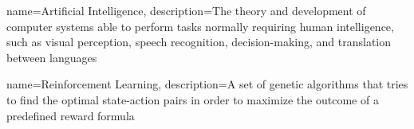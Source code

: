 
{
	name={Artificial Intelligence},
	description={The theory and development of computer systems able to perform tasks normally requiring human intelligence, such as visual perception, speech recognition, decision-making, and translation between languages}
}

{
	name={Reinforcement Learning},
	description={A set of genetic algorithms that tries to find the optimal state-action pairs in order to maximize the outcome of a predefined reward formula}
}





